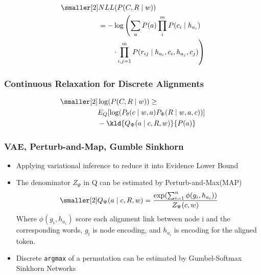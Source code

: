 \begin{equation}
  \label{eq:graph_prob_brief}
\begin{aligned} \smaller[2]
 & NLL(P(C,R \mid w)) \\
 & = - \log\left(\sum_{a}P(a) \prod_{i}^{m} P(c_{i} \mid h_{a_{i}}) \right. \\
 & \qquad \left.\cdot \prod_{i,j=1}^{m}P(r_{ij} \mid h_{a_{i}}, c_{i}, h_{a_{j}}, c_{j})\right)
\end{aligned}
\end{equation}

\subsubsection{Continuous Relaxation for Discrete Alignments}
\label{sssec:lex-phr:alignment-relax}

\begin{equation}
 \label{eq:elbo}
\begin{aligned} \smaller[2]
  & \log(P(C,R \mid w)) \geq \\
  & E_{Q}[\log(P_{\theta}(c\mid w,a) P_{\Phi}(R\mid w,a,c))] \\
  & - \kld{Q_{\Psi}(a\mid c, R,w)}{P(a)}
\end{aligned}
\end{equation}

\subsubsection{VAE, Perturb-and-Map, Gumble Sinkhorn}
\label{sssec:lex-phr:gumble-sinkhorn}
\begin{itemize}
\item Applying variational inference to reduce it into
  Evidence Lower Bound~\cite[ELBO,][]{kingma2013auto}
\item The denominator $Z_{\Psi}$ in Q can be estimated by Perturb-and-Max(MAP)~\cite{papandreouperturb}
\begin{equation}
  \label{eq:posterior_prob}
\begin{aligned} \smaller[2]
Q_{\Psi}(a\mid c, R,w)= \frac{\exp(\sum_{i=1}^{n} \phi(g_{i}, h_{a_{i}}))} {Z_{\Psi}(c,w)}
\end{aligned}
\end{equation}
Where $\phi(g_{i}, h_{a_{i}})$ score each alignment link between node i and the corresponding words,
$g_{i}$ is node encoding, and $h_{a_{i}}$ is encoding for the aligned token.

\item Discrete \texttt{argmax} of a permutation can be estimated by
  Gumbel-Softmax Sinkhorn Networks \cite{mena2018learning, lyu2018amr}
\end{itemize}

